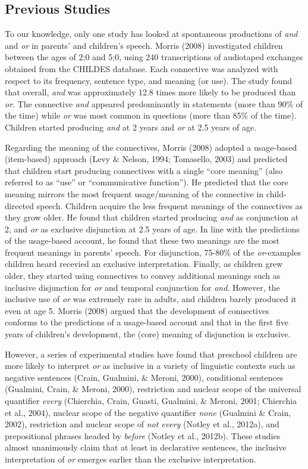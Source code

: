 \documentclass[,man,floatsintext]{apa6}
\begin{document}
\hypertarget{previous-studies}{%
\subsection{Previous Studies}\label{previous-studies}}

To our knowledge, only one study has looked at spontaneous productions of \emph{and} and \emph{or} in parents' and children's speech. Morris (2008) investigated children between the ages of 2;0 and 5;0, using 240 transcriptions of audiotaped exchanges obtained from the CHILDES database. Each connective was analyzed with respect to its frequency, sentence type, and meaning (or use). The study found that overall, \emph{and} was approximately 12.8 times more likely to be produced than \emph{or}. The connective \emph{and} appeared predominantly in statements (more than 90\% of the time) while \emph{or} was most common in questions (more than 85\% of the time). Children started producing \emph{and} at 2 years and \emph{or} at 2.5 years of age.

Regarding the meaning of the connectives, Morris (2008) adopted a usage-based (item-based) approach (Levy \& Nelson, 1994; Tomasello, 2003) and predicted that children start producing connectives with a single \enquote{core meaning} (also referred to as \enquote{use} or \enquote{communicative function}). He predicted that the core meaning mirrors the most frequent usage/meaning of the connective in child-directed speech. Children acquire the less frequent meanings of the connectives as they grow older. He found that children started producing \emph{and} as conjunction at 2, and \emph{or} as exclusive disjunction at 2.5 years of age. In line with the predictions of the usage-based account, he found that these two meanings are the most frequent meanings in parents' speech. For disjunction, 75-80\% of the \emph{or}-examples children heard recevied an exclusive interpretation. Finally, as children grew older, they started using connectives to convey additional meanings such as inclusive disjunction for \emph{or} and temporal conjunction for \emph{and}. However, the inclusive use of \emph{or} was extremely rare in adults, and children barely produced it even at age 5. Morris (2008) argued that the development of connectives conforms to the predictions of a usage-based account and that in the first five years of children's development, the (core) meaning of disjunction is exclusive.

However, a series of experimental studies have found that preschool children are more likely to interpret \emph{or} as inclusive in a variety of linguistic contexts such as negative sentences (Crain, Gualmini, \& Meroni, 2000), conditional sentences (Gualmini, Crain, \& Meroni, 2000), restriction and nuclear scope of the universal quantifier \emph{every} (Chierchia, Crain, Guasti, Gualmini, \& Meroni, 2001; Chierchia et al., 2004), nuclear scope of the negative quantifier \emph{none} (Gualmini \& Crain, 2002), restriction and nuclear scope of \emph{not every} (Notley et al., 2012a), and prepositional phrases headed by \emph{before} (Notley et al., 2012b). These studies almost unanimously claim that at least in declarative sentences, the inclusive interpretation of \emph{or} emerges earlier than the exclusive interpretation.
\end{document}
